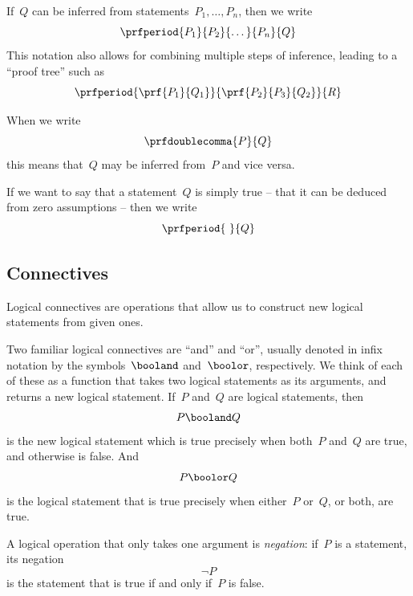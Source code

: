 If~$Q$ can be inferred from statements~$P_1, \ldots, P_n$, then we write
\begin{equation}
    \prfperiod{
        P_1
    }{
        P_2
    }{
        \dots
    }{
        P_n
    }{
        Q
    }
\end{equation}
This notation also allows for combining multiple steps of inference, leading to a ``proof tree'' such as
\begin{equation}
    \prfperiod{
        \prf{
            P_1
        }{
            Q_1
        }
    }{
        \prf{
            P_2
        }{
            P_3
        }{
            Q_2
        }
    }{
        R
    }
\end{equation}

When we write
\begin{equation}
    \prfdoublecomma{
        P
    }{
        Q
    }
\end{equation}
this means that~$Q$ may be inferred from~$P$ and vice versa.

If we want to say that a statement~$Q$ is simply true -- that it can be deduced from zero assumptions -- then we write
\begin{equation}
    \prfperiod{
        \
    }{
        Q
    }
\end{equation}

\subsection{Connectives}
\label{seq:booland}
\label{seq:boolor}
Logical connectives are operations that allow us to construct new logical statements from given ones.

Two familiar logical connectives are ``and'' and ``or'', usually denoted in infix notation by the symbols~$\booland$ and~$\boolor$, respectively.
We think of each of these as a function that takes two logical statements as its arguments, and returns a new logical statement.
If~$P$ and~$Q$ are logical statements, then
%
\begin{equation}
    P \booland Q
\end{equation}
%
is the new logical statement which is true precisely when both~$P$ and~$Q$ are true, and otherwise is false.
And
\begin{equation}
    P \boolor Q
\end{equation}
is the logical statement that is true precisely when either~$P$ or~$Q$, or both, are true.

A logical operation that only takes one argument is \emph{negation}: if~$P$ is a statement, its negation
\begin{equation}
    \lnot P
\end{equation}
is the statement that is true if and only if~$P$ is false.

